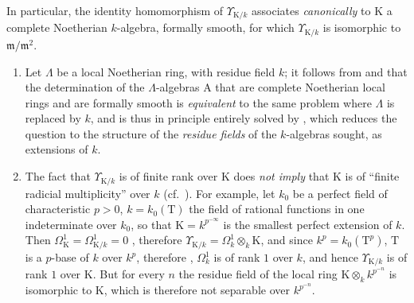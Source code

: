 In particular, the identity homomorphism of $\Upsilon_{\mathrm{K}/k}$ associates \emph{canonically} to $\mathrm{K}$ a complete Noetherian $k$-algebra, formally smooth, for which $\Upsilon_{\mathrm{K}/k}$ is isomorphic to $\mathfrak{m}/\mathfrak{m}^2$.

\begin{remark}[22.2.7]
\label{0.22.2.7}
\begin{enumerate}
  \item[\rm{(i)}] Let $\Lambda$ be a local Noetherian ring, with residue field $k$; it follows from  and  that the determination of the $\Lambda$-algebras $\mathrm{A}$ that are complete Noetherian local rings and are formally smooth is \emph{equivalent} to the same problem where $\Lambda$ is replaced by $k$, and is thus in principle entirely solved by , which reduces the question to the structure of the \emph{residue fields} of the $k$-algebras sought, as extensions of $k$.
  \item[\rm{(ii)}] The fact that $\Upsilon_{\mathrm{K}/k}$ is of finite rank over $\mathrm{K}$ does \emph{not imply} that $\mathrm{K}$ is of ``finite radicial multiplicity'' over $k$ (cf.~).
  For example, let $k_0$ be a perfect field of characteristic $p>0$, $k=k_0(\mathrm{T})$ the field of rational functions in one indeterminate over $k_0$, so that $\mathrm{K}=k^{p^{-\infty}}$ is the smallest perfect extension of $k$.
  Then $\Omega^1_\mathrm{K}=\Omega^1_{\mathrm{K}/k}=0$ , therefore $\Upsilon_{\mathrm{K}/k}=\Omega^1_k\otimes_k\mathrm{K}$, and since $k^p=k_0(\mathrm{T}^p)$, $\mathrm{T}$ is a $p$-base of $k$ over $k^p$, therefore , $\Omega^1_k$ is of rank $1$ over $k$, and hence $\Upsilon_{\mathrm{K}/k}$ is of rank $1$ over $\mathrm{K}$.
  But for every $n$ the residue field of the local ring $\mathrm{K}\otimes_kk^{p^{-n}}$ is isomorphic to $\mathrm{K}$, which is therefore not separable over $k^{p^{-n}}$.
\end{enumerate}
\end{remark}

